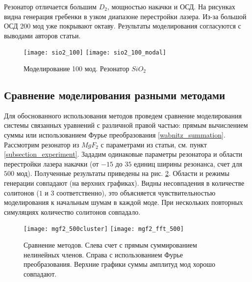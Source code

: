 Резонатор отличается большим $D_2$, мощностью накачки и ОСД. На рисунках видна генерация гребенки в узком диапазоне перестройки лазера. Из-за большой ОСД 200 мод уже покрывают октаву. Результаты моделирования согласуются с выводами авторов статьи.

\begin{figure}
  \texttt{[image: sio2\_100]}
  \texttt{[image: sio2\_100\_modal]}
  \caption{Моделирование 100 мод. Резонатор $SiO_2$} \label{sio2}
\end{figure}

\subsection{Сравнение моделирования разными методами}

Для обоснованного использования методов проведем сравнение моделирования системы связанных уравнений с различной правой частью: прямым вычислением суммы или использованием Фурье преобразования \ref{wabnitz_summation}. Рассмотрим резонатор из $MgF_2$ с параметрами из статьи\cite{Herr2014}, см. пункт \ref{subsection_experiment}. Зададим одинаковые параметры резонатора и области перестройки лазера накачки (от $-15$ до $35$ единиц ширины резонанса, счет для $500$ мод). Полученные результаты приведены на рис. \ref{comparison_sum_ft}. Области и режимы генерации совпадают (на верхних графиках). Видны несовпадения в количестве солитонов ($1$ и $3$ соответственно), это объясняется чувствительностью моделирования к начальным шумам в каждой моде. При нескольких повторных симуляциях количество солитонов совпадало.
\begin{figure}
  \texttt{[image: mgf2\_500cluster]}
  \texttt{[image: mgf2\_fft\_500]}
  \caption{Сравнение методов. Слева счет с прямым суммированием нелинейных членов. Справа с использованием Фурье преобразования. Верхние графики суммы амплитуд мод хорошо совпадают.} \label{comparison_sum_ft}
\end{figure}

